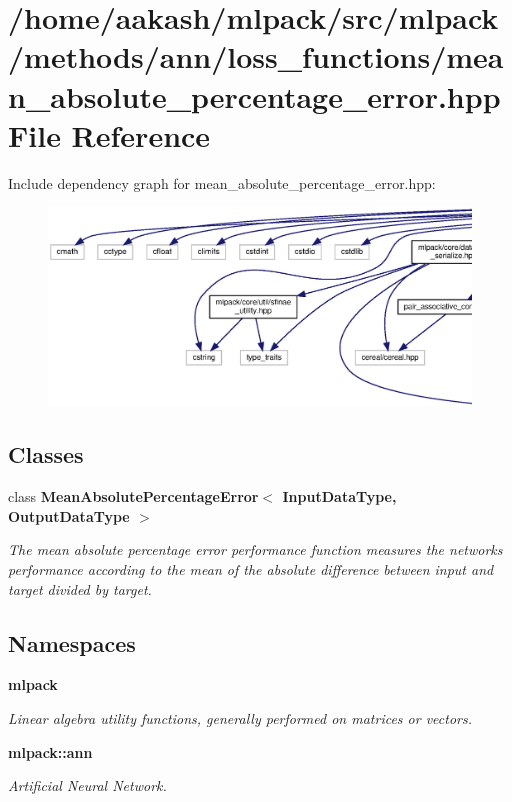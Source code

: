 \section{/home/aakash/mlpack/src/mlpack/methods/ann/loss\+\_\+functions/mean\+\_\+absolute\+\_\+percentage\+\_\+error.hpp File Reference}
\label{mean__absolute__percentage__error_8hpp}
Include dependency graph for mean\+\_\+absolute\+\_\+percentage\+\_\+error.\+hpp\+:
\nopagebreak
\begin{figure}[H]
\begin{center}
\leavevmode
\includegraphics[width=350pt]{mean__absolute__percentage__error_8hpp__incl}
\end{center}
\end{figure}
\subsection*{Classes}
\begin{DoxyCompactItemize}
\item 
class \textbf{ Mean\+Absolute\+Percentage\+Error$<$ Input\+Data\+Type, Output\+Data\+Type $>$}
\begin{DoxyCompactList}\small\item\em The mean absolute percentage error performance function measures the network\textquotesingle{}s performance according to the mean of the absolute difference between input and target divided by target. \end{DoxyCompactList}\end{DoxyCompactItemize}
\subsection*{Namespaces}
\begin{DoxyCompactItemize}
\item 
 \textbf{ mlpack}
\begin{DoxyCompactList}\small\item\em Linear algebra utility functions, generally performed on matrices or vectors. \end{DoxyCompactList}\item 
 \textbf{ mlpack\+::ann}
\begin{DoxyCompactList}\small\item\em Artificial Neural Network. \end{DoxyCompactList}\end{DoxyCompactItemize}


